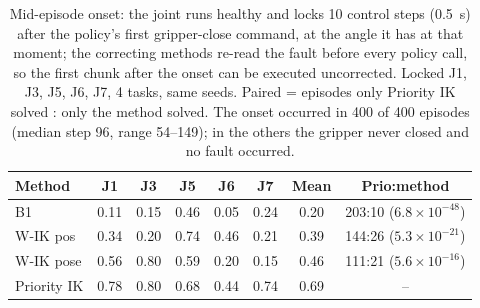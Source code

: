 \begin{table}[t]
\centering
\caption{Mid-episode onset: the joint runs healthy and locks 10 control steps (0.5~s) after the policy's first gripper-close command, at the angle it has at that moment; the correcting methods re-read the fault before every policy call, so the first chunk after the onset can be executed uncorrected. Locked J1, J3, J5, J6, J7, 4 tasks, same seeds. Paired = episodes only Priority IK solved : only the method solved. The onset occurred in 400 of 400 episodes (median step 96, range 54--149); in the others the gripper never closed and no fault occurred.}
\label{tab:mid_onset}
\setlength{\tabcolsep}{3pt}
\begin{tabular}{lccccccc}
\toprule
Method & J1 & J3 & J5 & J6 & J7 & Mean & Prio:method \\
\midrule
B1 & 0.11 & 0.15 & 0.46 & 0.05 & 0.24 & 0.20 & 203:10 ($6.8\times10^{-48}$) \\
W-IK pos & 0.34 & 0.20 & 0.74 & 0.46 & 0.21 & 0.39 & 144:26 ($5.3\times10^{-21}$) \\
W-IK pose & 0.56 & 0.80 & 0.59 & 0.20 & 0.15 & 0.46 & 111:21 ($5.6\times10^{-16}$) \\
Priority IK & 0.78 & 0.80 & 0.68 & 0.44 & 0.74 & 0.69 & -- \\
\bottomrule
\end{tabular}
\end{table}
